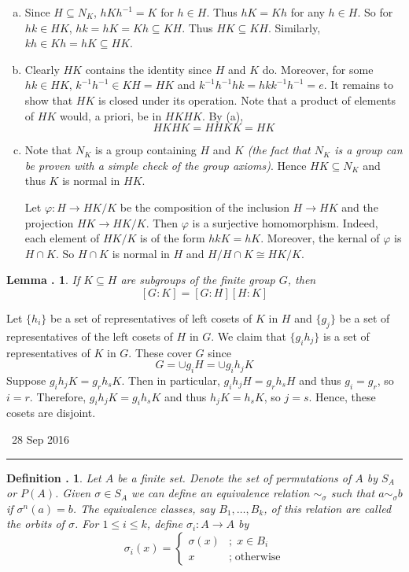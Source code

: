 \documentclass[twoside]{report}
\newcounter{Lecture}
\newcommand{\newLec}[1]{
  \stepcounter{Lecture}
  \noindent{\Large\bf Lecture \arabic{Lecture}} \, #1 \hfill  \rule[1ex]{2.5in}{.1pt} \vspace{1em}
}
\theoremstyle{myts}
\newcounter{c}[Lecture]
\newtheorem{dfn}[c]{Definition \arabic{Lecture}.}
\newtheorem{lma}[c]{Lemma \arabic{Lecture}.}
\newcounter{ex}[Lecture]
\newenvironment{prf}{
  \noindent\begin{mdframed}[style=prf]}{\end{mdframed} \vspace{1em}
}
\begin{document}
\begin{prf}
  \begin{enumerate}[(a)]
    \item Since $H\subseteq N_K$, $hKh^{-1} = K$ for $h\in H$. Thus $hK=Kh$ for any $h\in H$. So for $hk\in HK$, $hk = hK = Kh \subseteq KH$. Thus $HK\subseteq KH$. Similarly, $kh\in Kh = hK \subseteq HK$.

    \item Clearly $HK$ contains the identity since $H$ and $K$ do. Moreover, for some $hk\in HK$, $k^{-1}h^{-1}\in KH=HK$ and $k^{-1}h^{-1} hk = hk k^{-1}h^{-1} = e$. It remains to show that $HK$ is closed under its operation. Note that a product of elements of $HK$ would, a priori, be in $HKHK$. By (a),
    \[
      HKHK = HHKK = HK
    \]

    \item Note that $N_K$ is a group containing $H$ and $K$ \emph{(the fact that $N_K$ is a group can be proven with a simple check of the group axioms)}. Hence $HK\subseteq N_K$ and thus $K$ is normal in $HK$.

    Let $\varphi:H\to HK/K$ be the composition of the inclusion $H\to HK$ and the projection $HK \to HK/K$. Then $\varphi$ is a surjective homomorphism. Indeed, each element of \( HK/K \) is of the form \( hkK = hK \). Moreover, the kernal of $\varphi$ is $H\cap K$. So $H\cap K$ is normal in $H$ and $H/H\cap K \cong HK/K$.
  \end{enumerate}
\end{prf}

\begin{lma}
  If \( K\subseteq H \) are subgroups of the finite group $G$, then
  \[
    [G:K] = [G:H][H:K]
  \]
\end{lma}

\begin{prf}
  Let \( \{ h_i \} \) be a set of representatives of left cosets of $K$ in $H$ and \( \{ g_j \} \) be a set of representatives of the left cosets of $H$ in $G$. We claim that \( \{ g_ih_j \} \) is a set of representatives of $K$ in $G$. These cover $G$ since
  \[
    G = \cup g_i H = \cup g_i h_j K
  \]
  Suppose \( g_i h_j K = g_r h_s K \). Then in particular, \( g_i h_j H = g_r h_s H \) and thus \( g_i = g_r \), so \(i=r\). Therefore, \( g_i h_j K = g_i h_s K\) and thus \( h_j K = h_s K\), so \( j = s \). Hence, these cosets are disjoint.
\end{prf}

\newLec{28 Sep 2016}

\begin{dfn}
  Let $A$ be a finite set. Denote the \emph{set of permutations} of $A$ by $S_A$ or $P(A)$. Given \(\sigma\in S_A\) we can define an equivalence relation \( \sim_\sigma \) such that \( a\sim_\sigma b\) if \( \sigma^n (a) = b \). The equivalence classes, say $B_1,\ldots,B_k$, of this relation are called the \emph{orbits} of $\sigma$. For $1\leq i \leq k$, define \( \sigma_i : A \to A \) by
  \[
    \sigma_i(x) =
    \begin{cases}
      \sigma(x) &;\; x\in B_i \\
      x &;\; \textrm{otherwise}
    \end{cases}
  \]
\end{dfn}
\end{document}
